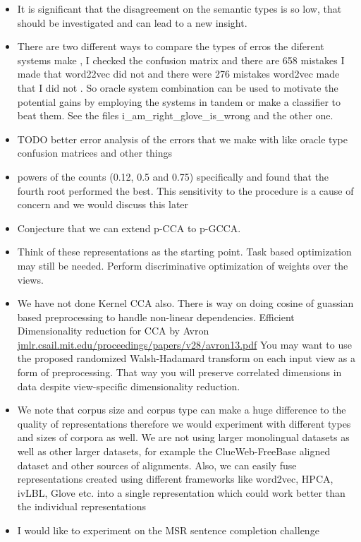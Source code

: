 \documentclass[11pt]{article}
\begin{document}
\begin{itemize}
\item It is significant that the disagreement on the semantic types is
  so low, that should be investigated and can lead to a new insight.
\item There are two different ways to compare the types of erros the
  diferent systems make , I checked the confusion matrix and there are
  658 mistakes I made that word22vec did not and there were 276
  mistakes word2vec made that I did not . So oracle system combination
  can be used to motivate the potential gains by employing the
  systems in tandem or make a classifier to beat them. See the files
  i\_am\_right\_glove\_is\_wrong and the other one.  
\item TODO better error analysis of the errors that we make with like oracle
type confusion matrices and other things
\item powers of the counts (0.12, 0.5 and 0.75) specifically and found
  that the fourth root performed the best. This sensitivity to
  the procedure is a cause of concern and we would discuss this later
\item Conjecture that we can extend p-CCA to p-GCCA.
\item Think of these representations as the starting point. Task based
  optimization may still be needed. Perform discriminative
  optimization of weights over the views.
\item We have not done Kernel CCA also.
  There is way on doing cosine of guassian based preprocessing to handle non-linear dependencies. 
Efficient Dimensionality reduction for CCA by Avron
\url{jmlr.csail.mit.edu/proceedings/papers/v28/avron13.pdf} 
You may want to use the proposed randomized Walsh-Hadamard transform
on each input view as a form of preprocessing. That way you will
preserve correlated dimensions in data despite view-specific
dimensionality reduction.
\item We note that corpus size and corpus type can make a huge
  difference to the quality of representations therefore we would
  experiment with different types and sizes of corpora as well. We are
  not using larger monolingual datasets as well as other larger 
datasets, for example the ClueWeb-FreeBase aligned dataset and other
sources of alignments. Also, we can easily fuse representations created using
different frameworks like word2vec, HPCA, ivLBL, Glove etc. into a
single representation which could work better than the individual representations
\item I would like to experiment on the MSR sentence completion challenge

\end{itemize}
\end{document}
